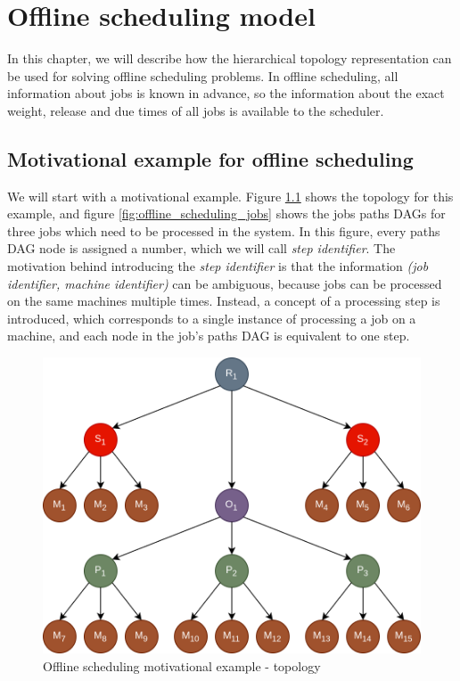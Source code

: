\chapter{Offline scheduling model}
\label{sec:offline_scheduling_model}

In this chapter, we will describe how the hierarchical topology representation can be used for solving offline scheduling problems. In offline scheduling, all information about jobs is known in advance, so the information about the exact weight, release and due times of all jobs is available to the scheduler.

\section{Motivational example for offline scheduling}
\label{sec:offline_scheduling_motivational_example}

We will start with a motivational example. Figure \ref{fig:offline_scheduling_topology} shows the topology for this example, and figure \ref{fig:offline_scheduling_jobs} shows the jobs paths DAGs for three jobs which need to be processed in the system. In this figure, every paths DAG node is assigned a number, which we will call \textit{step identifier}. The motivation behind introducing the \textit{step identifier} is that the information \textit{(job identifier, machine identifier)} can be ambiguous, because jobs can be processed on the same machines multiple times. Instead, a concept of a processing step is introduced, which corresponds to a single instance of processing a job on a machine, and each node in the job's paths DAG is equivalent to one step.

\begin{figure}[!htbp]
	\centering
	\includegraphics[scale=0.3]{../images/offline_scheduling_topology.png}
	\caption{Offline scheduling motivational example - topology}
    \label{fig:offline_scheduling_topology}
\end{figure}

